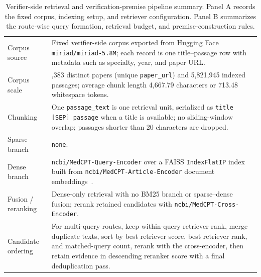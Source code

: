 \documentclass[a4paper,fleqn,doubleblind]{cas-sc}
\begin{document}
\begin{table}[htbp]
    \centering
    \caption{Verifier-side retrieval and verification-premise pipeline summary. Panel A records the fixed corpus, indexing setup, and retriever configuration. Panel B summarizes the route-wise query formation, retrieval budget, and premise-construction rules.}
    \label{tab:retrieval_protocol_template}
    {\footnotesize
    \setlength{\tabcolsep}{4pt}
    \renewcommand{\arraystretch}{1.12}
    \begin{tabular}{>{\raggedright\arraybackslash}p{}>{\raggedright\arraybackslash}p{}}
        \toprule
        \multicolumn{2}{l}{\textbf{Panel A: Corpus and retriever setup}} \\
        \midrule
        Corpus source & Fixed verifier-side corpus exported from Hugging Face \texttt{miriad/miriad-5.8M}; each record is one title--passage row with metadata such as specialty, year, and paper URL. \\
        \midrule
        Corpus scale & 812,383 distinct papers (unique \texttt{paper\_url}) and 5,821,945 indexed passages; average chunk length 4,667.79 characters or 713.48 whitespace tokens. \\
        \midrule
        Chunking & One \texttt{passage\_text} is one retrieval unit, serialized as \texttt{title [SEP] passage} when a title is available; no sliding-window overlap; passages shorter than 20 characters are dropped. \\
        \midrule
        Sparse branch & \texttt{none}. \\
        \midrule
        Dense branch & \texttt{ncbi/MedCPT-Query-Encoder} over a FAISS \texttt{IndexFlatIP} index built from \texttt{ncbi/MedCPT-Article-Encoder} document embeddings~\cite{jin2023medcpt}. \\
        \midrule
        Fusion / reranking & Dense-only retrieval with no BM25 branch or sparse--dense fusion; rerank retained candidates with \texttt{ncbi/MedCPT-Cross-Encoder}. \\
        \midrule
        Candidate ordering & For multi-query routes, keep within-query retriever rank, merge duplicate texts, sort by best retriever score, best retriever rank, and matched-query count, rerank with the cross-encoder, then retain evidence in descending reranker score with a final deduplication pass. \\
        \bottomrule
    \end{tabular}

    \vspace{0.45em}

}
\end{table}
\end{document}
